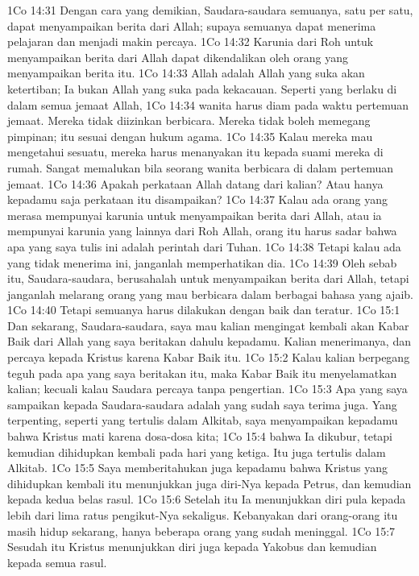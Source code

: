 1Co 14:31  Dengan cara yang demikian, Saudara-saudara semuanya, satu per satu, dapat menyampaikan berita dari Allah; supaya semuanya dapat menerima pelajaran dan menjadi makin percaya.
1Co 14:32  Karunia dari Roh untuk menyampaikan berita dari Allah dapat dikendalikan oleh orang yang menyampaikan berita itu.
1Co 14:33  Allah adalah Allah yang suka akan ketertiban; Ia bukan Allah yang suka pada kekacauan. Seperti yang berlaku di dalam semua jemaat Allah,
1Co 14:34  wanita harus diam pada waktu pertemuan jemaat. Mereka tidak diizinkan berbicara. Mereka tidak boleh memegang pimpinan; itu sesuai dengan hukum agama.
1Co 14:35  Kalau mereka mau mengetahui sesuatu, mereka harus menanyakan itu kepada suami mereka di rumah. Sangat memalukan bila seorang wanita berbicara di dalam pertemuan jemaat.
1Co 14:36  Apakah perkataan Allah datang dari kalian? Atau hanya kepadamu saja perkataan itu disampaikan?
1Co 14:37  Kalau ada orang yang merasa mempunyai karunia untuk menyampaikan berita dari Allah, atau ia mempunyai karunia yang lainnya dari Roh Allah, orang itu harus sadar bahwa apa yang saya tulis ini adalah perintah dari Tuhan.
1Co 14:38  Tetapi kalau ada yang tidak menerima ini, janganlah memperhatikan dia.
1Co 14:39  Oleh sebab itu, Saudara-saudara, berusahalah untuk menyampaikan berita dari Allah, tetapi janganlah melarang orang yang mau berbicara dalam berbagai bahasa yang ajaib.
1Co 14:40  Tetapi semuanya harus dilakukan dengan baik dan teratur.
1Co 15:1  Dan sekarang, Saudara-saudara, saya mau kalian mengingat kembali akan Kabar Baik dari Allah yang saya beritakan dahulu kepadamu. Kalian menerimanya, dan percaya kepada Kristus karena Kabar Baik itu.
1Co 15:2  Kalau kalian berpegang teguh pada apa yang saya beritakan itu, maka Kabar Baik itu menyelamatkan kalian; kecuali kalau Saudara percaya tanpa pengertian.
1Co 15:3  Apa yang saya sampaikan kepada Saudara-saudara adalah yang sudah saya terima juga. Yang terpenting, seperti yang tertulis dalam Alkitab, saya menyampaikan kepadamu bahwa Kristus mati karena dosa-dosa kita;
1Co 15:4  bahwa Ia dikubur, tetapi kemudian dihidupkan kembali pada hari yang ketiga. Itu juga tertulis dalam Alkitab.
1Co 15:5  Saya memberitahukan juga kepadamu bahwa Kristus yang dihidupkan kembali itu menunjukkan juga diri-Nya kepada Petrus, dan kemudian kepada kedua belas rasul.
1Co 15:6  Setelah itu Ia menunjukkan diri pula kepada lebih dari lima ratus pengikut-Nya sekaligus. Kebanyakan dari orang-orang itu masih hidup sekarang, hanya beberapa orang yang sudah meninggal.
1Co 15:7  Sesudah itu Kristus menunjukkan diri juga kepada Yakobus dan kemudian kepada semua rasul.
